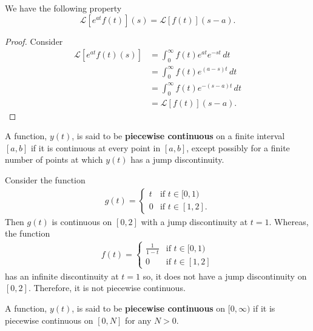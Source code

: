 \documentclass[12pt, a4paper]{article}
\newcommand{\CL}{\mathcal{L}}
\begin{document}
\begin{mdthm}
    We have the following property
    \[\CL[e^{at}f(t)](s) = \CL[f(t)](s-a).\]
\end{mdthm}

\begin{proof}
    Consider
    \[\begin{aligned}
        \CL[e^{at}f(t)(s)] &= \int_{0}^{\infty} f(t) e^{at} e^{-st} \, dt \\
        &= \int_{0}^{\infty} f(t) e^{(a-s)t} \, dt \\
        &= \int_{0}^{\infty} f(t) e^{-(s-a)t} \, dt \\
        &= \CL[f(t)](s-a).
    \end{aligned}\]
\end{proof}

\begin{definition}
    A function, \(y(t)\), is said to be \textbf{piecewise continuous} on a finite interval \([a,b]\) if it is continuous at every point in \([a,b]\), except possibly for a finite number of points at which \(y(t)\) has a jump discontinuity.
\end{definition}

\begin{example}
    Consider the function 
    \[\begin{aligned}
        g(t) = \begin{cases}
            t &\text{if } t\in[0,1) \\
            0 &\text{if } t\in[1,2].
        \end{cases}
    \end{aligned}\]
    Then \(g(t)\) is continuous on \([0,2]\) with a jump discontinuity at \(t=1\). Whereas, the function 
    \[\begin{aligned}
        f(t) = \begin{cases}
            \frac{1}{1-t} &\text{if } t\in[0,1) \\
            0 &\text{if } t\in[1,2]
        \end{cases}
    \end{aligned}\]
    has an infinite discontinuity at \(t=1\) so, it does not have a jump discontinuity on \([0,2]\). Therefore, it is not piecewise continuous.
\end{example}

\begin{definition}
    A function, \(y(t)\), is said to be \textbf{piecewise continuous} on \([0,\infty)\) if it is piecewise continuous on \([0,N]\) for any \(N >0\).
\end{definition}
\end{document}
